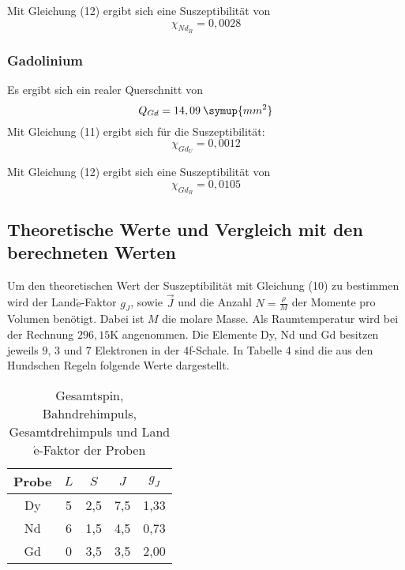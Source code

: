 Mit Gleichung (12) ergibt sich eine Suszeptibilität von
\begin{equation*}
  \chi_{Nd_R} = 0,0028 %
\end{equation*}

\subsubsection{Gadolinium}
Es ergibt sich ein realer Querschnitt von
\begin{equation*}
  Q_{Gd} = 14,09 \: \symup{mm^2}  %
\end{equation*}
Mit Gleichung (11) ergibt sich für die Suszeptibilität:
\begin{equation*}
  \chi_{Gd_U} = 0,0012 %
\end{equation*}

Mit Gleichung (12) ergibt sich eine Suszeptibilität von
\begin{equation*}
  \chi_{Gd_R} = 0,0105 %
\end{equation*}


\subsection{Theoretische Werte und Vergleich mit den berechneten Werten}

Um den theoretischen Wert der Suszeptibilität mit Gleichung (10) zu bestimmen wird der Land$\acute{\text{e}}$-Faktor $g_J$, sowie $\vec{J}$ und
die Anzahl $N= \frac{\rho}{M}$ der Momente pro Volumen benötigt. Dabei ist $M$ die molare Masse. Als Raumtemperatur wird bei der
Rechnung $296,15$K angenommen. Die Elemente Dy, Nd und Gd besitzen jeweils $9$, $3$ und $7$ Elektronen in der 4f-Schale. In Tabelle 4
sind die aus den Hundschen Regeln folgende Werte dargestellt.

\begin{table}[H]
  \centering
  \caption{Gesamtspin, Bahndrehimpuls, Gesamtdrehimpuls und Land$\acute{\text{e}}$-Faktor der Proben}
  \label{tab:Dy}
  \begin{tabular}{c c c c c}
    \toprule
    Probe & $L$ & $S$ & $J$  & $g_J$  \\
    \midrule
    Dy & 5 & 2,5 & 7,5 & 1,33\\
    Nd & 6 & 1,5 & 4,5 & 0,73\\
    Gd & 0 & 3,5 & 3,5 & 2,00\\
    \bottomrule
  \end{tabular}
\end{table}

